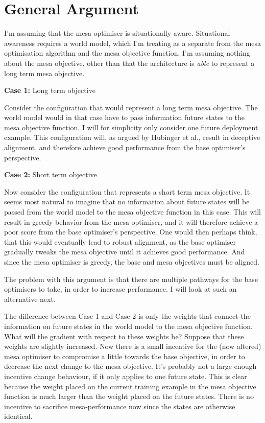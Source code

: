 \documentclass[11pt]{article}
\begin{document}
\section{General Argument}\label{sec:generalargument}
I'm assuming that the mesa optimiser is situationally aware.
Situational awareness requires a world model, which I'm treating as a separate from the mesa optimisation algorithm and
the mesa objective function.
I'm assuming nothing about the mesa objective, other than that the architecture is \emph{able} to represent a long term
mesa objective.

\textbf{Case 1:} Long term objective

Consider the configuration that would represent a long term mesa objective.
The world model would in that case have to pass information future states to the mesa objective function.
I will for simplicity only consider one future deployment example.
This configuration will, as argued by Hubinger et al.\cite{hubinger2021}, result in deceptive alignment, and therefore
achieve good performance from the base optimiser's perspective.

\textbf{Case 2:} Short term objective

Now consider the configuration that represents a short term mesa objective.
It seems most natural to imagine that no information about future states will be passed from the world model to the mesa
objective function in this case.
This will result in greedy behavior from the mesa optimiser, and it will therefore achieve a poor score from the base
optimiser's perspective.
One would then perhaps think, that this would eventually lead to robust alignment, as the base optimiser gradually
tweaks the mesa objective until it achieves good performance.
And since the mesa optimiser is greedy, the base and mesa objectives must be aligned.

The problem with this argument is that there are multiple pathways for the base optimisers to take, in order to increase
performance.
I will look at such an alternative next.

The difference between Case 1 and Case 2 is only the weights that connect the information on future states in the world
model to the mesa objective function.
What will the gradient with respect to these weights be?
Suppose that these weights are slightly increased.
Now there is a small incentive for the (now altered) mesa optimiser to compromise a little towards the base objective,
in order to decrease the next change to the mesa objective.
It's probably not a large enough incentive change behaviour, if it only applies to one future state.
This is clear because the weight placed on the current training example in the mesa objective function is much larger
than the weight placed on the future states.
There is no incentive to sacrifice mesa-performance now since the states are otherwise identical.
\end{document}
